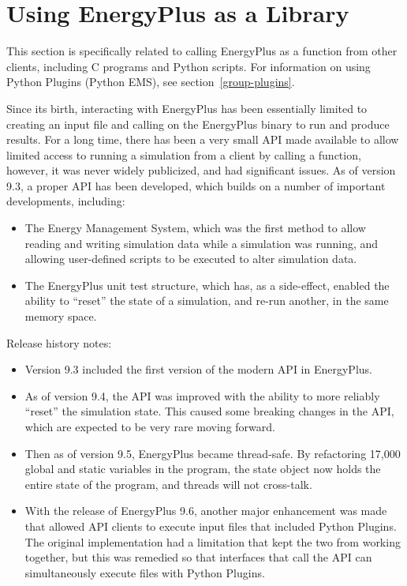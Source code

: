 
\section{Using EnergyPlus as a Library}\label{sec:api-usage}

This section is specifically related to calling EnergyPlus as a function from other clients, including C programs and Python scripts.
For information on using Python Plugins (Python EMS), see section~\ref{group-plugins}.

Since its birth, interacting with EnergyPlus has been essentially limited to creating an input file and calling on the EnergyPlus binary to run and produce results.
For a long time, there has been a very small API made available to allow limited access to running a simulation from a client by calling a function, however, it was never widely publicized, and had significant issues.
As of version 9.3, a proper API has been developed, which builds on a number of important developments, including:

\begin{itemize}
 \item The Energy Management System, which was the first method to allow reading and writing simulation data while a simulation was running, and allowing user-defined scripts to be executed to alter simulation data.
 \item The EnergyPlus unit test structure, which has, as a side-effect, enabled the ability to ``reset'' the state of a simulation, and re-run another, in the same memory space.
\end{itemize}

Release history notes:

\begin{itemize}
    \item Version 9.3 included the first version of the modern API in EnergyPlus.
    \item As of version 9.4, the API was improved with the ability to more reliably ``reset'' the simulation state.  This caused some breaking changes in the API, which are expected to be very rare moving forward.
    \item Then as of version 9.5, EnergyPlus became thread-safe.  By refactoring 17,000 global and static variables in the program, the state object now holds the entire state of the program, and threads will not cross-talk.
    \item With the release of EnergyPlus 9.6, another major enhancement was made that allowed API clients to execute input files that included Python Plugins. The original implementation had a limitation that kept the two from working together, but this was remedied so that interfaces that call the API can simultaneously execute files with Python Plugins.
\end{itemize}

